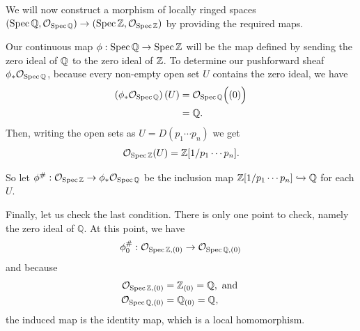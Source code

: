 \begin{example}\label{Good Q to Z}
We will now construct a morphism of locally ringed spaces $(\operatorname{Spec} \mathbb{Q}, \mathcal{O}_{\operatorname{Spec}\mathbb{Q}}) \to (\operatorname{Spec}\mathbb{Z}, \mathcal{O}_{\operatorname{Spec}\mathbb{Z}})$ by providing the required maps.
\end{example}
Our continuous map $\phi : \operatorname{Spec}\mathbb{Q} \to \operatorname{Spec}\mathbb{Z}$ will be the map defined by sending the zero ideal of $\mathbb{Q}$ to the zero ideal of $\mathbb{Z}$. To determine our pushforward sheaf $\phi_\ast \mathcal{O}_{\operatorname{Spec}\mathbb{Q}}$, because every non-empty open set $U$ contains the zero ideal, we have
\begin{align*}
(\phi_\ast \mathcal{O}_{\operatorname{Spec}\mathbb{Q}})\left(U\right)
&= 	
\mathcal{O}_{\operatorname{Spec}\mathbb{Q}}\Big((0)\Big)\\
&= \mathbb{Q}.
\end{align*}
Then, writing the open sets as $U = D(p_1 \cdots p_n)$ we get
\begin{equation}
\mathcal{O}_{\operatorname{Spec}\mathbb{Z}}(U) = \mathbb{Z}[1/p_1 \cdots p_n].
\end{equation}

So let $\phi^\# : \mathcal{O}_{\operatorname{Spec}\mathbb{Z}} \to \phi_\ast\mathcal{O}_{\operatorname{Spec}\mathbb{Q}}$ be the inclusion map $\mathbb{Z}[1/p_1\cdots p_n] \xhookrightarrow{} \mathbb{Q}$ for each $U$.

Finally, let us check the last condition.
There is only one point to check, namely the zero ideal of \(\mathbb{Q}\).
At this point, we have
\[\phi_0^\# : \mathcal{O}_{\operatorname{Spec}\mathbb{Z}, (0)} \to \mathcal{O}_{\operatorname{Spec}\mathbb{Q}, (0)}\] and because
\begin{align*}
\mathcal{O}_{\operatorname{Spec}\mathbb{Z}, (0)} 	&= 	\mathbb{Z}_{(0)} = \mathbb{Q}, \text{ and }\\
\mathcal{O}_{\operatorname{Spec}\mathbb{Q}, (0)} 	&= 	\mathbb{Q}_{(0)} = \mathbb{Q},
\end{align*}
the induced map is the identity map, which is a local homomorphism.

